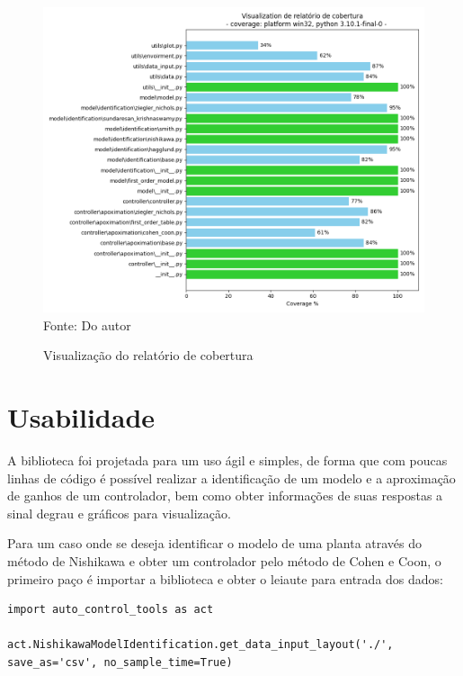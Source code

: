 \begin{figure}[H]
    \centering
    \caption{Visualização do relatório de cobertura}
    \includegraphics[scale=0.6]{figuras/coverage}
    \label{fig:coverage}
    \\
    \vspace{0cm}\hspace{0cm}\small{Fonte: Do autor}
\end{figure}


\section{Usabilidade}

A biblioteca foi projetada para um uso ágil e simples, de forma que com poucas linhas de código é possível realizar a
identificação de um modelo e a aproximação de ganhos de um controlador, bem como obter informações de suas respostas
a sinal degrau e gráficos para visualização.

Para um caso onde se deseja identificar o modelo de uma planta através do método de Nishikawa e obter um controlador
pelo método de Cohen e Coon, o primeiro paço é importar a biblioteca e obter o leiaute para entrada dos dados:

\begin{lstlisting}[label={lst:get_dil}]
import auto_control_tools as act

act.NishikawaModelIdentification.get_data_input_layout('./', save_as='csv', no_sample_time=True)
\end{lstlisting}


